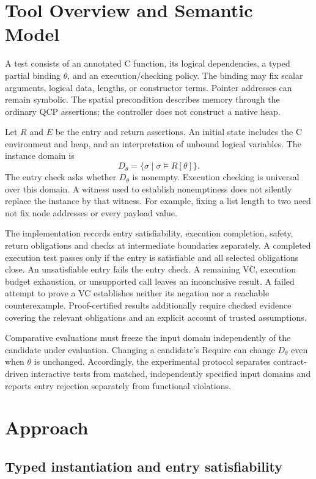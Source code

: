\section{Tool Overview and Semantic Model}

A test consists of an annotated C function, its logical dependencies, a typed
partial binding $\theta$, and an execution/checking policy. The binding may fix
scalar arguments, logical data, lengths, or constructor terms. Pointer addresses
can remain symbolic. The spatial precondition describes memory through the
ordinary QCP assertions; the controller does not construct a native heap.

Let $R$ and $E$ be the entry and return assertions. An initial state includes
the C environment and heap, and an interpretation of unbound logical variables.
The instance domain is
\[
  D_\theta = \{\sigma \mid \sigma \models R[\theta]\}.
\]
The entry check asks whether $D_\theta$ is nonempty. Execution checking is
universal over this domain. A witness used to establish nonemptiness does not
silently replace the instance by that witness. For example, fixing a list
length to two need not fix node addresses or every payload value.

The implementation records entry satisfiability, execution completion, safety,
return obligations and checks at intermediate boundaries separately. A completed
execution test passes only if the entry is satisfiable and all selected
obligations close. An unsatisfiable entry fails the entry check. A remaining VC,
execution budget exhaustion, or unsupported call leaves an inconclusive result.
A failed attempt to prove a VC establishes neither its negation nor a reachable
counterexample. Proof-certified results additionally require checked evidence
covering the relevant obligations and an explicit account of trusted assumptions.

Comparative evaluations must freeze the input domain independently of the
candidate under evaluation. Changing a candidate's Require can change
$D_\theta$ even when $\theta$ is unchanged. Accordingly, the experimental
protocol separates contract-driven interactive tests from matched, independently
specified input domains and reports entry rejection separately from functional
violations.

\section{Approach}

\subsection{Typed instantiation and entry satisfiability}

